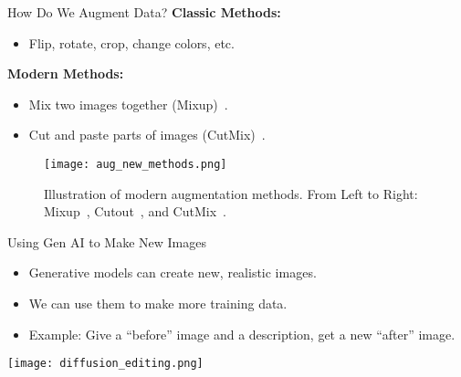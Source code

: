 \begin{refsection}
\begin{frame}{How Do We Augment Data?}
  \textbf{Classic Methods:}
  \begin{itemize}
    \item Flip, rotate, crop, change colors, etc.
  \end{itemize}
  \textbf{Modern Methods:}
  \begin{itemize}
    \item Mix two images together (Mixup)~\parencite{zhangMixupEMPIRICALRISK2018}.
    \item Cut and paste parts of images (CutMix)~\parencite{yunCutMixRegularizationStrategy2019}.
  \end{itemize}
  \begin{figure}
    \centering
    \texttt{[image: aug\_new\_methods.png]}
    \caption[]{\scriptsize Illustration of modern augmentation methods. From Left to Right: Mixup~\parencite{zhangMixupEMPIRICALRISK2018}, Cutout~\parencite{devriesImprovedRegularizationConvolutional2017}, and CutMix~\parencite{yunCutMixRegularizationStrategy2019}.}
  \end{figure}
  \bottomleftrefs
\end{frame}
\end{refsection}


\begin{refsection}
\begin{frame}{Using Gen AI to Make New Images}
  \begin{itemize}
    \item Generative models can create new, realistic images.
    \item We can use them to make more training data.
    \item Example: Give a “before” image and a description, get a new “after” image.
  \end{itemize}
  \centering
  \texttt{[image: diffusion\_editing.png]}
\end{frame}
\end{refsection}

